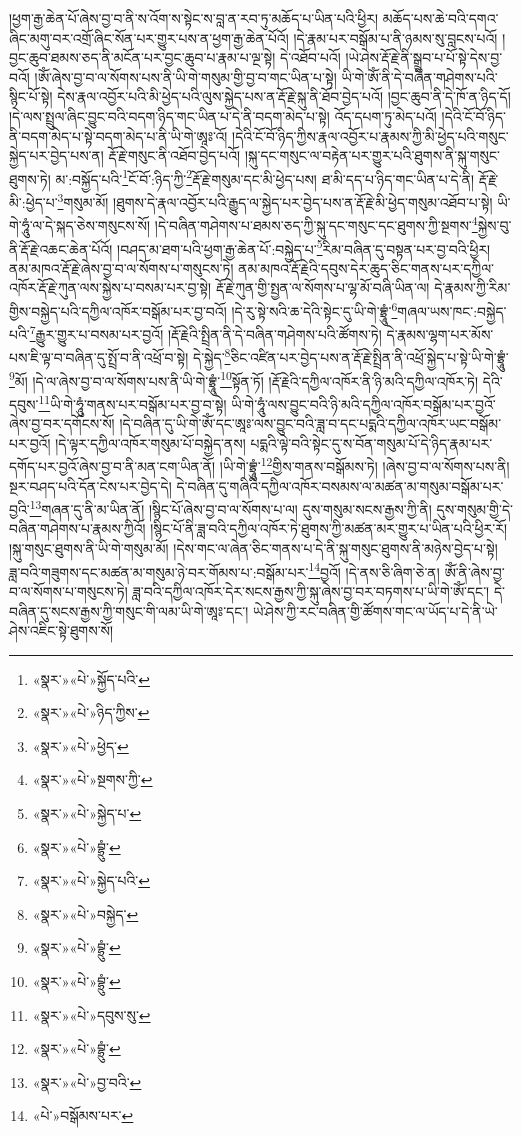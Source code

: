 །ཕྱག་རྒྱ་ཆེན་པོ་ཞེས་བྱ་བ་ནི་ས་འོག་ས་སྟེང་ས་བླ་ན་རབ་ཏུ་མཆོད་པ་ཡིན་པའི་ཕྱིར། མཆོད་པས་ཆེ་བའི་དགའ་ཞིང་མགུ་བར་འགྲོ་ཞིང་སོན་པར་གྱུར་པས་ན་ཕྱག་རྒྱ་ཆེན་པོའོ། །དེ་རྣམ་པར་བསྒོམ་པ་ནི་ཉམས་སུ་བླངས་པའོ། །བྱང་ཆུབ་ཐམས་ཅད་ནི་མངོན་པར་བྱང་ཆུབ་པ་རྣམ་པ་ལྔ་སྟེ། དེ་འཐོབ་པའོ། །ཡེ་ཤེས་རྡོ་རྗེ་ནི་སྒྲུབ་པ་པོ་སྟེ་དེས་བྱ་བའོ། །ཨོཾ་ཞེས་བྱ་བ་ལ་སོགས་པས་ནི་ཡི་གེ་གསུམ་གྱི་བྱ་བ་གང་ཡིན་པ་སྟེ། ཡི་གེ་ཨོཾ་ནི་དེ་བཞིན་གཤེགས་པའི་སྙིང་པོ་སྟེ། དེས་རྣལ་འབྱོར་པའི་མི་ཕྱེད་པའི་ལུས་སྐྱེད་པས་ན་རྡོ་རྗེ་སྐུ་ནི་ཐོབ་བྱེད་པའོ། །བྱང་ཆུབ་ནི་དེ་ཁོ་ན་ཉིད་དོ། །དེ་ལས་སྤྲུལ་ཞིང་བྱུང་བའི་བདག་ཉིད་གང་ཡིན་པ་དེ་ནི་བདག་མེད་པ་སྟེ། འོད་དཔག་ཏུ་མེད་པའོ། །དེའི་ངོ་བོ་ཉིད་ནི་བདག་མེད་པ་སྟེ་བདག་མེད་པ་ནི་ཡི་གེ་ཨཱཿ་འོ། །དེའི་ངོ་བོ་ཉིད་ཀྱིས་རྣལ་འབྱོར་པ་རྣམས་ཀྱི་མི་ཕྱེད་པའི་གསུང་སྐྱེད་པར་བྱེད་པས་ན། རྡོ་རྗེ་གསུང་ནི་འཐོབ་བྱེད་པའོ། །སྐུ་དང་གསུང་ལ་བརྟེན་པར་གྱུར་པའི་ཐུགས་ནི་སྐུ་གསུང་ཐུགས་ཏེ། མ་:བསྐྱོད་པའི་\footnote{«སྣར་»«པེ་»སྐྱོད་པའི་}ངོ་བོ་:ཉིད་ཀྱི་\footnote{«སྣར་»«པེ་»ཉིད་ཀྱིས་}རྡོ་རྗེ་གསུམ་དང་མི་ཕྱེད་པས། ཐ་མི་དད་པ་ཉིད་གང་ཡིན་པ་དེ་ནི། རྡོ་རྗེ་མི་:ཕྱེད་པ་\footnote{«སྣར་»«པེ་»ཕྱེད་}གསུམ་མོ། །ཐུགས་དེ་རྣལ་འབྱོར་པའི་རྒྱུད་ལ་སྐྱེད་པར་བྱེད་པས་ན་རྡོ་རྗེ་མི་ཕྱེད་གསུམ་འཐོབ་པ་སྟེ། ཡི་གེ་ཧཱུཾ་ལ་དེ་སྐད་ཅེས་གསུངས་སོ། །དེ་བཞིན་གཤེགས་པ་ཐམས་ཅད་ཀྱི་སྐུ་དང་གསུང་དང་ཐུགས་ཀྱི་སྔགས་\footnote{«སྣར་»«པེ་»སྔགས་ཀྱི་}སྐྱེས་བུ་ནི་རྡོ་རྗེ་འཆང་ཆེན་པོའོ། །བཤད་མ་ཐག་པའི་ཕྱག་རྒྱ་ཆེན་པོ་:བསྐྱེད་པ་\footnote{«སྣར་»«པེ་»སྐྱེད་པ་}རིམ་བཞིན་དུ་བསྟན་པར་བྱ་བའི་ཕྱིར། ནམ་མཁའ་རྡོ་རྗེ་ཞེས་བྱ་བ་ལ་སོགས་པ་གསུངས་ཏེ། ནམ་མཁའ་རྡོ་རྗེའི་དབུས་དེར་ཆུད་ཅིང་གནས་པར་དཀྱིལ་འཁོར་རྡོ་རྗེ་ཀུན་ལས་སྐྱེས་པ་བསམ་པར་བྱ་སྟེ། རྡོ་རྗེ་ཀུན་གྱི་སྤྱན་ལ་སོགས་པ་ལྷ་མོ་བཞི་ཡིན་ལ། དེ་རྣམས་ཀྱི་རིམ་གྱིས་བསྐྱེད་པའི་དཀྱིལ་འཁོར་བསྒོམ་པར་བྱ་བའོ། །དེ་རུ་སྟེ་སའི་ཆ་དེའི་སྟེང་དུ་ཡི་གེ་བྷྲཱུཾ་\footnote{«སྣར་»«པེ་»བྷྲུཾ་}གཞལ་ཡས་ཁང་:བསྐྱེད་པའི་\footnote{«སྣར་»«པེ་»སྐྱེད་པའི་}རྒྱུར་གྱུར་པ་བསམ་པར་བྱའོ། །རྡོ་རྗེའི་སྤྲིན་ནི་དེ་བཞིན་གཤེགས་པའི་ཚོགས་ཏེ། དེ་རྣམས་ལྷག་པར་མོས་པས་ཇི་ལྟ་བ་བཞིན་དུ་སྤྲོ་བ་ནི་འཕྲོ་བ་སྟེ། དེ་སྐྱེད་\footnote{«སྣར་»«པེ་»བསྐྱེད་}ཅིང་འཛིན་པར་བྱེད་པས་ན་རྡོ་རྗེ་སྤྲིན་ནི་འཕྲོ་སྐྱེད་པ་སྟེ་ཡི་གེ་བྷྲཱུཾ་\footnote{«སྣར་»«པེ་»བྷྲུཾ་}མོ། །དེ་ལ་ཞེས་བྱ་བ་ལ་སོགས་པས་ནི་ཡི་གེ་བྷྲཱུཾ་\footnote{«སྣར་»«པེ་»བྷྲུཾ་}སྟོན་ཏོ། །རྡོ་རྗེའི་དཀྱིལ་འཁོར་ནི་ཉི་མའི་དཀྱིལ་འཁོར་ཏེ། དེའི་དབུས་\footnote{«སྣར་»«པེ་»དབུས་སུ་}ཡི་གེ་ཧཱུཾ་གནས་པར་བསྒོམ་པར་བྱ་བ་སྟེ། ཡི་གེ་ཧཱུཾ་ལས་བྱུང་བའི་ཉི་མའི་དཀྱིལ་འཁོར་བསྒོམ་པར་བྱའོ་ཞེས་བྱ་བར་དགོངས་སོ། །དེ་བཞིན་དུ་ཡི་གེ་ཨོཾ་དང་ཨཱཿ་ལས་བྱུང་བའི་ཟླ་བ་དང་པདྨའི་དཀྱིལ་འཁོར་ཡང་བསྒོམ་པར་བྱའོ། །དེ་ལྟར་དཀྱིལ་འཁོར་གསུམ་པོ་བསྐྱེད་ནས། པདྨའི་ལྟེ་བའི་སྟེང་དུ་ས་བོན་གསུམ་པོ་དེ་ཉིད་རྣམ་པར་དགོད་པར་བྱའོ་ཞེས་བྱ་བ་ནི་མན་ངག་ཡིན་ནོ། །ཡི་གེ་བྷྲཱུཾ་\footnote{«སྣར་»«པེ་»བྷྲུཾ་}གྱིས་གནས་བསྒོམས་ཏེ། །ཞེས་བྱ་བ་ལ་སོགས་པས་ནི། སྔར་བཤད་པའི་དོན་ངེས་པར་བྱེད་དེ། དེ་བཞིན་དུ་གཞིའི་དཀྱིལ་འཁོར་བསམས་ལ་མཚན་མ་གསུམ་བསྒོམ་པར་བྱའི་\footnote{«སྣར་»«པེ་»བྱ་བའི་}གཞན་དུ་ནི་མ་ཡིན་ནོ། །སྙིང་པོ་ཞེས་བྱ་བ་ལ་སོགས་པ་ལ། དུས་གསུམ་སངས་རྒྱས་ཀྱི་ནི། དུས་གསུམ་གྱི་དེ་བཞིན་གཤེགས་པ་རྣམས་ཀྱིའོ། །སྙིང་པོ་ནི་ཟླ་བའི་དཀྱིལ་འཁོར་ཏེ་ཐུགས་ཀྱི་མཚན་མར་གྱུར་པ་ཡིན་པའི་ཕྱིར་རོ། །སྐུ་གསུང་ཐུགས་ནི་ཡི་གེ་གསུམ་མོ། །དེས་གང་ལ་ཞེན་ཅིང་གནས་པ་དེ་ནི་སྐུ་གསུང་ཐུགས་ནི་མཉེས་བྱེད་པ་སྟེ། ཟླ་བའི་གཟུགས་དང་མཚན་མ་གསུམ་ཉེ་བར་གོམས་པ་:བསྒོམ་པར་\footnote{«པེ་»བསྒོམས་པར་}བྱའོ། །དེ་ནས་ཅི་ཞིག་ཅེ་ན། ཨོཾ་ནི་ཞེས་བྱ་བ་ལ་སོགས་པ་གསུངས་ཏེ། ཟླ་བའི་དཀྱིལ་འཁོར་དེར་སངས་རྒྱས་ཀྱི་སྐུ་ཞེས་བྱ་བར་བཏགས་པ་ཡི་གེ་ཨོཾ་དང་། དེ་བཞིན་དུ་སངས་རྒྱས་ཀྱི་གསུང་གི་ལམ་ཡི་གེ་ཨཱཿ་དང་། ཡེ་ཤེས་ཀྱི་རང་བཞིན་གྱི་ཚོགས་གང་ལ་ཡོད་པ་དེ་ནི་ཡེ་ཤེས་འཇིང་སྟེ་ཐུགས་སོ། 